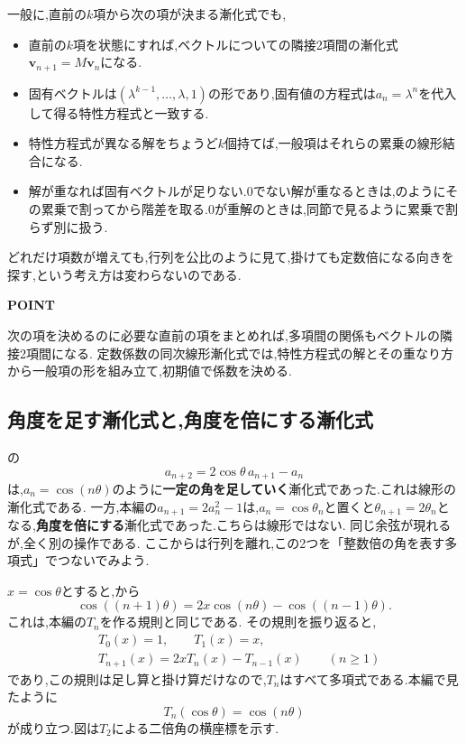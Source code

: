 一般に,直前の$k$項から次の項が決まる漸化式でも,
\begin{itemize}
  \item 直前の$k$項を状態にすれば,ベクトルについての隣接2項間の漸化式$\boldsymbol v_{n+1}=M\boldsymbol v_n$になる.
  \item 固有ベクトルは$(\lambda^{k-1},\ldots,\lambda,1)$の形であり,固有値の方程式は$a_n=\lambda^n$を代入して得る特性方程式と一致する.
  \item 特性方程式が異なる解をちょうど$k$個持てば,一般項はそれらの累乗の線形結合になる.
  \item 解が重なれば固有ベクトルが足りない.0でない解が重なるときは,のようにその累乗で割ってから階差を取る.0が重解のときは,同節で見るように累乗で割らず別に扱う.
\end{itemize}
どれだけ項数が増えても,行列を公比のように見て,掛けても定数倍になる向きを探す,という考え方は変わらないのである.

\begin{bookpoint}
  \textbf{POINT}\par
  次の項を決めるのに必要な直前の項をまとめれば,多項間の関係もベクトルの隣接2項間になる.
  定数係数の同次線形漸化式では,特性方程式の解とその重なり方から一般項の形を組み立て,初期値で係数を決める.
\end{bookpoint}

\subsection{角度を足す漸化式と,角度を倍にする漸化式}\label{節：角度を足す漸化式と,角度を倍にする漸化式}

の
\[
  a_{n+2}=2\cos\theta\,a_{n+1}-a_n
\]
は,$a_n=\cos(n\theta)$のように\textbf{一定の角を足していく}漸化式であった.これは線形の漸化式である.
一方,本編の$a_{n+1}=2a_n^2-1$は,$a_n=\cos\theta_n$と置くと$\theta_{n+1}=2\theta_n$となる,\textbf{角度を倍にする}漸化式であった.こちらは線形ではない.
同じ余弦が現れるが,全く別の操作である.
ここからは行列を離れ,この2つを「整数倍の角を表す多項式」でつないでみよう.

$x=\cos\theta$とすると,から
\[
  \cos((n+1)\theta)=2x\cos(n\theta)-\cos((n-1)\theta).
\]
これは,本編の$T_n$を作る規則と同じである.
その規則を振り返ると,
\begin{align*}
  &T_0(x)=1,\qquad T_1(x)=x,\\
  &T_{n+1}(x)=2xT_n(x)-T_{n-1}(x)
  \qquad(n\ge1)
\end{align*}
であり,この規則は足し算と掛け算だけなので,$T_n$はすべて多項式である.本編で見たように
\[
  T_n(\cos\theta)=\cos(n\theta)
\]
が成り立つ.図は$T_2$による二倍角の横座標を示す.
\BookFigChebyshev

